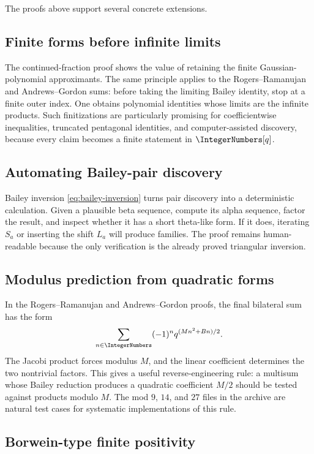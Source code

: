 \documentclass[11pt]{article}
\theoremstyle{blueplain}
\theoremstyle{bluedef}
\begin{document}
The proofs above support several concrete extensions.

\subsection{Finite forms before infinite limits}

The continued-fraction proof shows the value of retaining the finite Gaussian-polynomial approximants.  The same principle applies to the Rogers--Ramanujan and Andrews--Gordon sums: before taking the limiting Bailey identity, stop at a finite outer index.  One obtains polynomial identities whose limits are the infinite products.  Such finitizations are particularly promising for coefficientwise inequalities, truncated pentagonal identities, and computer-assisted discovery, because every claim becomes a finite statement in $\IntegerNumbers[q]$.

\subsection{Automating Bailey-pair discovery}

Bailey inversion \eqref{eq:bailey-inversion} turns pair discovery into a deterministic calculation.  Given a plausible beta sequence, compute its alpha sequence, factor the result, and inspect whether it has a short theta-like form.  If it does, iterating $S_a$ or inserting the shift $L_a$ will produce families.  The proof remains human-readable because the only verification is the already proved triangular inversion.

\subsection{Modulus prediction from quadratic forms}

In the Rogers--Ramanujan and Andrews--Gordon proofs, the final bilateral sum has the form
\[
\sum_{n\in\IntegerNumbers}(-1)^nq^{(Mn^2+Bn)/2}.
\]
The Jacobi product forces modulus $M$, and the linear coefficient determines the two nontrivial factors.  This gives a useful reverse-engineering rule: a multisum whose Bailey reduction produces a quadratic coefficient $M/2$ should be tested against products modulo $M$.  The mod $9$, $14$, and $27$ files in the archive are natural test cases for systematic implementations of this rule.

\subsection{Borwein-type finite positivity}
\end{document}

